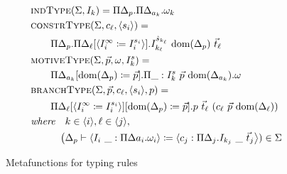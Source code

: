 \begin{figure}
\centering

\begin{align*}
    &\indtype{\Sigma}{I_k} = \Pi \Delta_p . \Pi \Delta_{a_k} . \omega_k \\
    &\constrtype{\Sigma}{c_\ell}{\langle s_i \rangle} = \\
    &\qquad \Pi \Delta_p . \Pi \Delta_\ell [\langle I_i^\infty \coloneqq I_i^{s_i} \rangle] . I_{k_\ell}^{\hat{s}_{k_\ell}}\ \dom{\Delta_p}\ \vec{t}_\ell \\
    &\motivetype{\Sigma}{\vec{p}}{\omega}{I_k^s} = \\
    &\qquad \Pi \Delta_{a_k}[\dom{\Delta_p} \coloneqq \vec{p}] . \Pi \_ : I_k^s\ \vec{p}\ \dom{\Delta_{a_k}} . \omega \\
    &\branchtype{\Sigma}{\vec{p}}{c_\ell}{\langle s_i \rangle}{p} = \\
    &\qquad \Pi \Delta_\ell [\langle I_i^\infty \coloneqq I_i^{s_i} \rangle][\dom{\Delta_p} \coloneqq \vec{p}] . p\ \vec{t}_\ell\ (c_\ell\ \vec{p}\ \dom{\Delta_\ell}) \\
    &\textit{where}\quad k \in \langle i \rangle, \ell \in \langle j \rangle, \\
    &\quad\qquad\big(\Delta_p \vdash \langle I_i\ \_ : \Pi\Delta{a_i} . \omega_i \rangle \coloneqq \langle c_j : \Pi \Delta_j . I_{k_j}\ \_\ \vec{t}_j \big \rangle) \in \Sigma
\end{align*}

\caption{Metafunctions for typing rules}
\label{fig:metafunctions}
\end{figure}